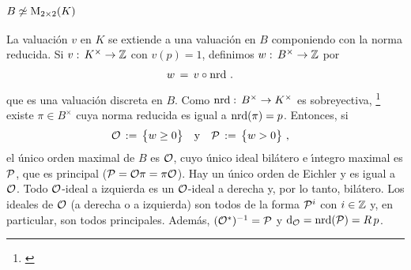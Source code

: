 \subsubsection{$B\not\simeq\MM_{2\times 2}(K)$}
La valuaci\'{o}n $v$ en $K$ se extiende a una valuaci\'{o}n en $B$ componiendo
con la norma reducida. Si $v:\,K^{\times}\rightarrow\bb{Z}$ con $v(p)=1$,
definimos $w:\,B^{\times}\rightarrow\bb{Z}$ por
\begin{align*}
	w & \,=\,v\circ\nrd
	\text{ .}
\end{align*}
%
que es una valuaci\'{o}n discreta en $B$. Como
$\nrd:\,B^{\times}\rightarrow K^{\times}$ es sobreyectiva,%
\footnote{
	\cite[Ch.~X \S~2]{WeilBasic}
}
existe $\pi\in B^{\times}$ cuya norma reducida es igual a $\nrd(\pi)=p$.
Entonces, si
\begin{align*}
	\cal{O}\,:=\, \big\{ w\geq 0\big\} & \quad\text{y}\quad
		\cal{P}\,:=\, \big\{ w>0 \big\}
	\text{ ,}
\end{align*}
%
el \'{u}nico orden maximal de $B$ es $\cal{O}$, cuyo \'{u}nico ideal
bil\'{a}tero e \'{\i}ntegro maximal es $\cal{P}$, que es principal
($\cal{P}=\cal{O}\pi=\pi\cal{O}$). Hay un \'{u}nico orden de Eichler y es igual
a $\cal{O}$. Todo $\cal{O}$-ideal a izquierda es un $\cal{O}$-ideal a derecha
y, por lo tanto, bil\'{a}tero. Los ideales de $\cal{O}$ (a derecha o a
izquierda) son todos de la forma $\cal{P}^{i}$ con $i\in\bb{Z}$ y, en
particular, son todos principales. Adem\'{a}s, $(\cal{O}^{*})^{-1}=\cal{P}$ y
$\drd{\cal{O}}=\nrd(\cal{P})=R\,p$.
